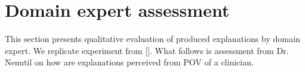 

\section{Domain expert assessment}

This section presents qualitative evaluation of produced explanations by domain expert. We replicate experiment from []. What follows is assessment from Dr. Nenutil on how are explanations perceived from POV of a clinician.
